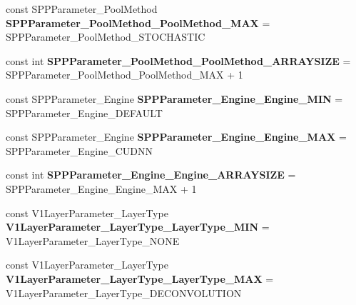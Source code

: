 \begin{DoxyCompactItemize}
\mbox{\label{namespacecaffe_a3f25abf2949a8a1a2f17d75785c38e0a}} 
const S\+P\+P\+Parameter\+\_\+\+Pool\+Method {\bfseries S\+P\+P\+Parameter\+\_\+\+Pool\+Method\+\_\+\+Pool\+Method\+\_\+\+M\+AX} = S\+P\+P\+Parameter\+\_\+\+Pool\+Method\+\_\+\+S\+T\+O\+C\+H\+A\+S\+T\+IC
\item 
\mbox{\label{namespacecaffe_aedb557a44ed09f8058e58b0df3e882e7}} 
const int {\bfseries S\+P\+P\+Parameter\+\_\+\+Pool\+Method\+\_\+\+Pool\+Method\+\_\+\+A\+R\+R\+A\+Y\+S\+I\+ZE} = S\+P\+P\+Parameter\+\_\+\+Pool\+Method\+\_\+\+Pool\+Method\+\_\+\+M\+AX + 1
\item 
\mbox{\label{namespacecaffe_a47d78b4ce718d63af91ad032561bdef0}} 
const S\+P\+P\+Parameter\+\_\+\+Engine {\bfseries S\+P\+P\+Parameter\+\_\+\+Engine\+\_\+\+Engine\+\_\+\+M\+IN} = S\+P\+P\+Parameter\+\_\+\+Engine\+\_\+\+D\+E\+F\+A\+U\+LT
\item 
\mbox{\label{namespacecaffe_ae3fb6550171d8e322877678acc859380}} 
const S\+P\+P\+Parameter\+\_\+\+Engine {\bfseries S\+P\+P\+Parameter\+\_\+\+Engine\+\_\+\+Engine\+\_\+\+M\+AX} = S\+P\+P\+Parameter\+\_\+\+Engine\+\_\+\+C\+U\+D\+NN
\item 
\mbox{\label{namespacecaffe_addb86b79fe59a940001a326af06af442}} 
const int {\bfseries S\+P\+P\+Parameter\+\_\+\+Engine\+\_\+\+Engine\+\_\+\+A\+R\+R\+A\+Y\+S\+I\+ZE} = S\+P\+P\+Parameter\+\_\+\+Engine\+\_\+\+Engine\+\_\+\+M\+AX + 1
\item 
\mbox{\label{namespacecaffe_a6e9d7e460a6064a44338f09591aaca78}} 
const V1\+Layer\+Parameter\+\_\+\+Layer\+Type {\bfseries V1\+Layer\+Parameter\+\_\+\+Layer\+Type\+\_\+\+Layer\+Type\+\_\+\+M\+IN} = V1\+Layer\+Parameter\+\_\+\+Layer\+Type\+\_\+\+N\+O\+NE
\item 
\mbox{\label{namespacecaffe_a815aefe4c5bb9d1b05b5d958f51f59c4}} 
const V1\+Layer\+Parameter\+\_\+\+Layer\+Type {\bfseries V1\+Layer\+Parameter\+\_\+\+Layer\+Type\+\_\+\+Layer\+Type\+\_\+\+M\+AX} = V1\+Layer\+Parameter\+\_\+\+Layer\+Type\+\_\+\+D\+E\+C\+O\+N\+V\+O\+L\+U\+T\+I\+ON
\item 
\mbox{\label{namespacecaffe_a68bd761cafb029e6c9f951a0d10dda14}} 

\end{DoxyCompactItemize}

